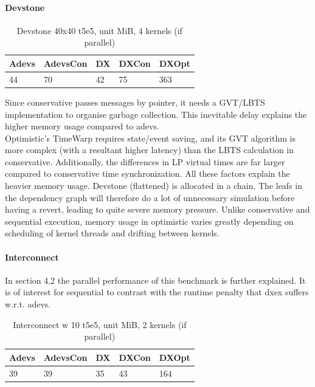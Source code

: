 \paragraph*{Devstone}
\begin{table}[lhtb]
	\centering
	\caption{Devstone 40x40 t5e5, unit MiB, 4 kernels (if parallel)}
	\label{dtone_mem}
	\begin{tabular}{| l | l | l | l | l |}
		\hline
		Adevs & AdevsCon &DX &DXCon &DXOpt\\ \hline
		44 & 70 & 42 & 75 & 363  \\ \hline
	\end{tabular}
\end{table}
Since conservative passes messages by pointer, it needs a GVT/LBTS implementation to organise garbage collection. This inevitable delay explains the higher memory usage compared to adevs.\\
Optimistic's TimeWarp requires state/event saving, and its GVT algorithm is more complex (with a resultant higher latency) than the LBTS calculation in conservative. 
Additionally, the differences in LP virtual times are far larger compared to conservative time synchronization. All these factors explain the heavier memory usage. Devstone (flattened) is allocated in a chain. The leafs in the dependency graph will therefore do a lot of unnecessary simulation before having a revert, leading to quite severe memory pressure. Unlike conservative and sequential execution, memory usage in optimistic varies greatly depending on scheduling of kernel threads and drifting between kernels. 
\paragraph*{Interconnect}
In section 4.2 the parallel performance of this benchmark is further explained. It is of interest for sequential to contrast with the runtime penalty that dxex suffers w.r.t. adevs. 
\begin{table}[lhtb]
	\centering
	\caption{Interconnect w 10 t5e5, unit MiB, 2 kernels (if parallel)}
	\label{iconn_mem}
	\begin{tabular}{| l | l | l | l | l |}
		\hline
		Adevs & AdevsCon &DX &DXCon & DXOpt\\ \hline
		39 & 39 & 35 & 43 & 164 \\ \hline
	\end{tabular}
\end{table}
		
